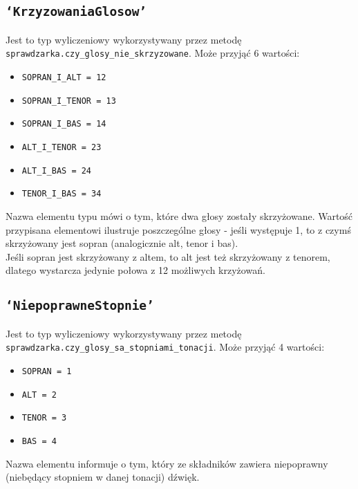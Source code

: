 \documentclass[dokumentacja.tex]{subfiles}
\begin{document}
\subsection{\texttt{`KrzyzowaniaGlosow'}}
Jest to typ wyliczeniowy wykorzystywany przez metodę \texttt{sprawdzarka.czy\_glosy\_nie\_skrzyzowane}. Może przyjąć 6 wartości:
\begin{itemize}
    \item \texttt{SOPRAN\_I\_ALT = 12}
    \item \texttt{SOPRAN\_I\_TENOR = 13}
    \item \texttt{SOPRAN\_I\_BAS = 14}
    \item \texttt{ALT\_I\_TENOR = 23}
    \item \texttt{ALT\_I\_BAS = 24}
    \item \texttt{TENOR\_I\_BAS = 34}
\end{itemize} 
Nazwa elementu typu mówi o tym, które dwa głosy zostały skrzyżowane. Wartość przypisana elementowi ilustruje poszczególne głosy - jeśli występuje 1, to z czymś skrzyżowany jest sopran (analogicznie alt, tenor i bas).\\
Jeśli sopran jest skrzyżowany z altem, to alt jest też skrzyżowany z tenorem, dlatego wystarcza jedynie połowa z 12 możliwych krzyżowań.


\subsection{\texttt{`NiepoprawneStopnie'}}
Jest to typ wyliczeniowy wykorzystywany przez metodę \texttt{sprawdzarka.czy\_glosy\_sa\_stopniami\_tonacji}. Może przyjąć 4 wartości:
\begin{itemize}
    \item \texttt{SOPRAN = 1}
    \item \texttt{ALT = 2}
    \item \texttt{TENOR = 3}
    \item \texttt{BAS = 4}
\end{itemize} 
Nazwa elementu informuje o tym, który ze składników zawiera niepoprawny (niebędący stopniem w danej tonacji) dźwięk.
\end{document}
